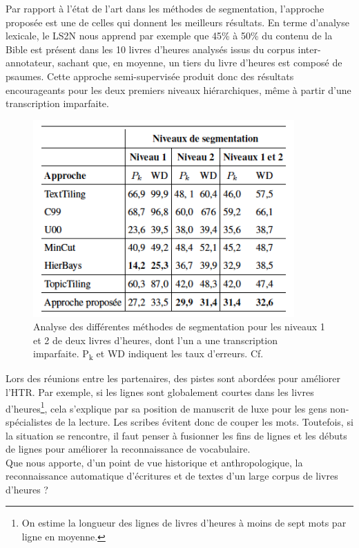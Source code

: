 \documentclass[a4paper,12pt,twoside]{book}
\begin{document}
	Par rapport à l'état de l'art dans les méthodes de segmentation, l'approche proposée est une de celles qui donnent les meilleurs résultats. En terme d'analyse lexicale, le LS2N nous apprend par exemple que 45\% à 50\% du contenu de la Bible est présent dans les 10 livres d’heures analysés issus du corpus inter-annotateur, sachant que, en moyenne, un tiers du livre d’heures est composé de psaumes. Cette approche semi-supervisée produit donc des résultats encourageants pour les deux premiers niveaux hiérarchiques, même à partir d'une transcription imparfaite. 
	
    \begin{figure}[!h]
    \centering
    \includegraphics[width=10cm]{img/ML/Niveau_Segmentation.png}
    \caption{Analyse des différentes méthodes de segmentation pour les niveaux 1 et 2 de deux livres d'heures, dont l'un a une transcription imparfaite. P\textsubscript{k} et WD indiquent les taux d'erreurs. Cf. \cite[p. 32]{Seg_Livres_Heures}}
    \end{figure}
    
    Lors des réunions entre les partenaires, des pistes sont abordées pour améliorer l'HTR. Par exemple, si les lignes sont globalement courtes dans les livres d’heures\footnote{On estime la longueur des lignes de livres d'heures à moins de sept mots par ligne en moyenne.}, cela s'explique par sa position de manuscrit de luxe pour les gens non-spécialistes de la lecture. Les scribes évitent donc de couper les mots. Toutefois, si la situation se rencontre, il faut penser à fusionner les fins de lignes et les débuts de lignes pour améliorer la reconnaissance de vocabulaire. \\
    
    Que nous apporte, d'un point de vue historique et anthropologique, la reconnaissance automatique d'écritures et de textes d'un large corpus de livres d'heures ?
\end{document}
